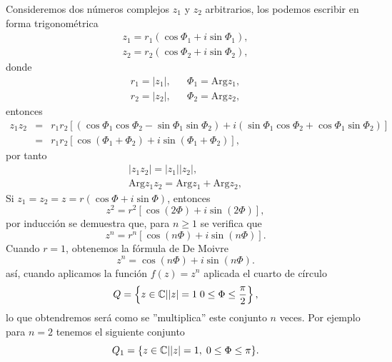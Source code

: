 Consideremos dos números complejos $z_1$ y $z_2$ arbitrarios, los podemos escribir en forma trigonométrica
\[
	\begin{array}{c}
		z_1=r_1(\cos\Phi_1+i\sin\Phi_1),\\
		z_2=r_2(\cos\Phi_2+i\sin\Phi_2),
	\end{array}
\]
donde 
\[
	\begin{array}{ccl}
		r_1=|z_1|,&&\Phi_1=\mbox{Arg}z_1,\\
		r_2=|z_2|,&&\Phi_2=\mbox{Arg}z_2,
	\end{array}
\]
entonces 
\[
	\begin{array}{ccl}
		z_1z_2&=&r_1r_2[(\cos\Phi_1\cos\Phi_2-\sin\Phi_1\sin\Phi_2)+i(\sin\Phi_1\cos\Phi_2+\cos\Phi_1\sin\Phi_2)]\\
		&=&r_1r_2[\cos(\Phi_1+\Phi_2)+i\sin(\Phi_1+\Phi_2)],
	\end{array}
\]
por tanto
\[
\begin{array}{c}
	|z_1z_2|=|z_1||z_2|,\\
	\mbox{Arg}z_1z_2=\mbox{Arg}z_1+\mbox{Arg}z_2,
\end{array}
\]
Si $z_1=z_2=z=r(\cos\Phi+i\sin\Phi)$, entonces
$$z^2=r^2[\cos(2\Phi)+i\sin(2\Phi)],$$ 
por inducción se demuestra que, para $n\geq 1$ se verifica que 
$$z^n=r^n[\cos(n\Phi)+i\sin(n\Phi)].$$
Cuando $r=1$, obtenemos la fórmula de De Moivre
$$z^n=\cos(n\Phi)+i\sin(n\Phi).$$
así, cuando aplicamos la función $f(z)=z^n$ aplicada el cuarto de círculo $$Q=\left\{z\in \mathbb{C} | |z|=1\; 0\leq \Phi\leq \dfrac{\pi}{2}\right\},$$
lo que obtendremos será como se ''multiplica'' este conjunto $n$ veces. Por ejemplo para $n=2$ tenemos el siguiente conjunto
$$Q_1=\{z\in \mathbb{C} | |z|=1,\; 0\leq \Phi\leq \pi\}.$$
